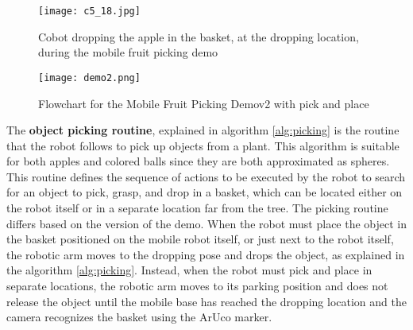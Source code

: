 \begin{figure}[hpt]
    \centering
    \texttt{[image: c5\_18.jpg]}
    \caption{Cobot dropping the apple in the basket, at the dropping location, during the mobile fruit picking demo}
    \label{fig:mfp3}
\end{figure}

\begin{figure}[hpt]
    \centering
    \texttt{[image: demo2.png]}
    \caption{Flowchart for the Mobile Fruit Picking Demov2 with pick and place}
    \label{fig:mfp_flowchart}
\end{figure}

The \textbf{object picking routine}, explained in algorithm \ref{alg:picking} is the routine that the robot follows
to pick up objects from a plant. This algorithm is suitable for both apples and colored balls since they are
both approximated as spheres. This routine defines the sequence of actions to be executed by the robot
to search for an object to pick, grasp, and drop in a basket, which can be located either on the robot itself
or in a separate location far from the tree.
The picking routine differs based on the version of the demo. When the robot must place the object
in the basket positioned on the mobile robot itself, or just next to the robot itself, the robotic arm moves to
the dropping pose and drops the object, as explained in the algorithm \ref{alg:picking}. Instead, when the robot
must pick and place in separate locations, the robotic arm moves to its parking position and does not release the object
until the mobile base has reached the dropping location and the camera recognizes the basket using the ArUco marker.

